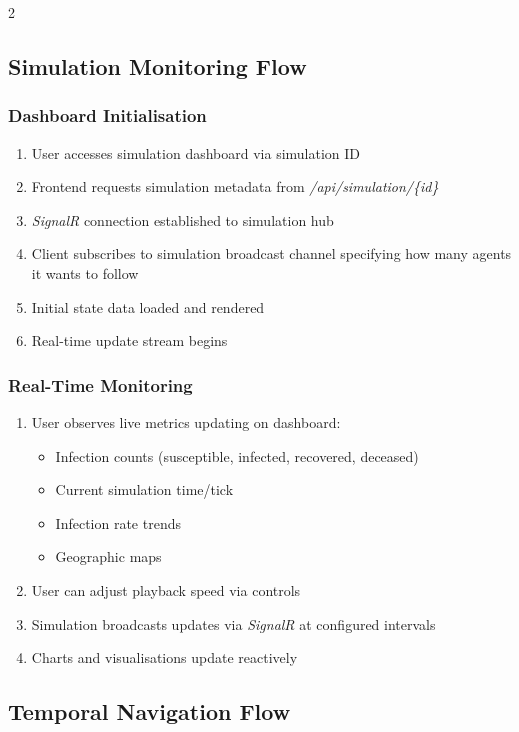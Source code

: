 \begin{multicols}{2}
\subsection{Simulation Monitoring Flow}

\subsubsection*{Dashboard Initialisation}
\begin{enumerate}
    \item User accesses simulation dashboard via simulation ID
    \item Frontend requests simulation metadata from \textit{/api\allowbreak/simulation\allowbreak/\{id\}}
    \item \textit{SignalR} connection established to simulation hub
    \item Client subscribes to simulation broadcast channel specifying how many agents it wants to follow
    \item Initial state data loaded and rendered
    \item Real-time update stream begins
\end{enumerate}

\subsubsection*{Real-Time Monitoring}
\begin{enumerate}
    \item User observes live metrics updating on dashboard:
    \begin{itemize}
        \item Infection counts (susceptible, infected, recovered, deceased)
        \item Current simulation time/tick
        \item Infection rate trends
        \item Geographic maps
    \end{itemize}
    \item User can adjust playback speed via controls
    \item Simulation broadcasts updates via \textit{SignalR} at configured intervals
    \item Charts and visualisations update reactively
\end{enumerate}

\subsection{Temporal Navigation Flow}


\end{multicols}
